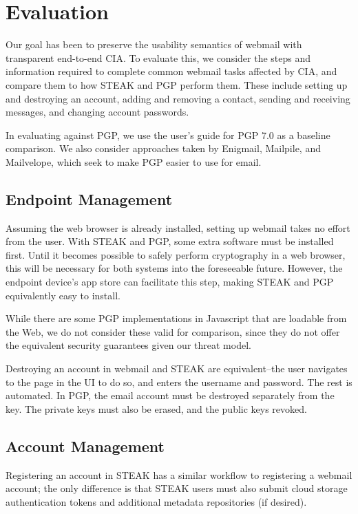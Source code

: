 \section{Evaluation}

Our goal has been to preserve the usability semantics of webmail with transparent end-to-end CIA.  To evaluate this, we consider the steps and information required to complete common webmail tasks affected by CIA, and compare them to how STEAK and PGP perform them.  These include setting up and destroying an account, adding and removing a contact, sending and receiving messages, and changing account passwords.

In evaluating against PGP, we use the user’s guide for PGP 7.0 as a baseline comparison.  We also consider approaches taken by Enigmail, Mailpile, and Mailvelope, which seek to make PGP easier to use for email.

\subsection{Endpoint Management}
Assuming the web browser is already installed, setting up webmail takes no effort from the user.  With STEAK and PGP, some extra software must be installed first.  Until it becomes possible to safely perform cryptography in a web browser, this will be necessary for both systems into the foreseeable future.  However, the endpoint device’s app store can facilitate this step, making STEAK and PGP equivalently easy to install.

While there are some PGP implementations in Javascript that are loadable from the Web, we do not consider these valid for comparison, since they do not offer the equivalent security guarantees given our threat model.

Destroying an account in webmail and STEAK are equivalent--the user navigates to the page in the UI to do so, and enters the username and password.  The rest is automated.  In PGP, the email account must be destroyed separately from the key.  The private keys must also be erased, and the public keys revoked.

\subsection{Account Management}
Registering an account in STEAK has a similar workflow to registering a webmail account; the only difference is that STEAK users must also submit cloud storage authentication tokens and additional metadata repositories (if desired).

